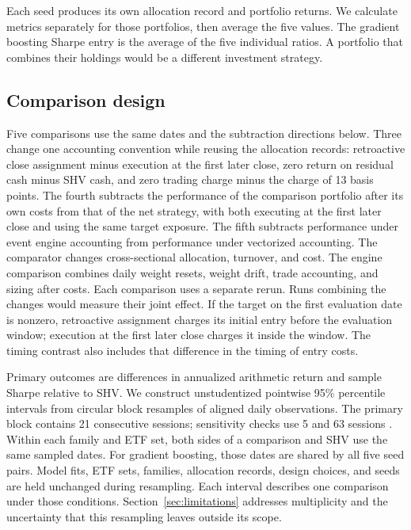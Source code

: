 \documentclass{article}
\begin{document}
Each seed produces its own allocation record and portfolio returns. We calculate metrics separately for those portfolios, then average the five values. The gradient boosting Sharpe entry is the average of the five individual ratios. A portfolio that combines their holdings would be a different investment strategy.

\subsection{Comparison design}

Five comparisons use the same dates and the subtraction directions below. Three change one accounting convention while reusing the allocation records:
retroactive close assignment minus execution at the first later close, zero return on residual cash minus SHV cash, and zero trading charge minus the charge of 13 basis points.
The fourth subtracts the performance of the comparison portfolio after its own costs from that of the net strategy, with both executing at the first later close and using the same target exposure.
The fifth subtracts performance under event engine accounting from performance under vectorized accounting. The comparator changes
cross-sectional allocation, turnover, and cost. The engine comparison combines
daily weight resets, weight drift, trade accounting, and sizing after costs. Each comparison uses a separate rerun. Runs combining the changes would measure their joint effect.
If the target on the first evaluation date is nonzero, retroactive assignment charges its initial entry before the evaluation window; execution at the first later close charges it inside the window. The timing contrast also includes that difference in the timing of entry costs.

Primary outcomes are differences in annualized arithmetic return and
sample Sharpe relative to SHV. We construct unstudentized pointwise 95\%
percentile intervals from \ExpansionBootstrapReplications{} circular block resamples
of aligned daily observations. The primary block contains 21 consecutive sessions; sensitivity checks use 5 and 63 sessions
\citep{politis1992circular}. Within each family and ETF set, both sides of a comparison and SHV use the same sampled dates. For gradient boosting, those dates are shared by all five seed pairs. Model fits, ETF sets, families, allocation records, design choices, and seeds are held unchanged during resampling. Each interval describes one comparison under those conditions. Section~\ref{sec:limitations} addresses multiplicity and the uncertainty that this resampling leaves outside its scope.
\end{document}
